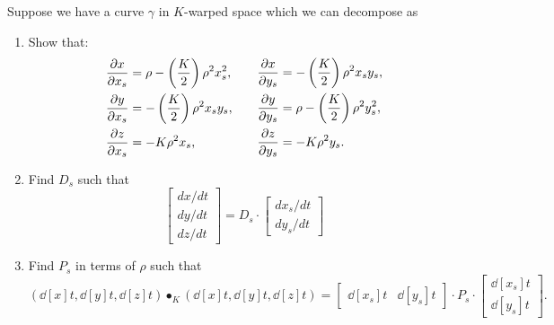 \documentclass[hints,handout,12pt,noauthor,nooutcomes]{ximera}
\begin{document}
\begin{problem}
  Suppose we have a curve $\gamma$ in $K$-warped space which we can
decompose as

\begin{center}
\end{center}

\begin{enumerate}
\item Show that:
\[
  \begin{split}
    \pp[x]{x_s} &=\rho-\left(\frac{K}{2}\right)\rho^2x_s^2,\\
    \pp[y]{x_s} &=-\left(\frac{K}{2}\right)\rho^2x_sy_s,\\
    \pp[z]{x_s} &=-K\rho^2x_s,
  \end{split}
  \qquad
  \begin{split}
    \pp[x]{y_s} &= -\left(\frac{K}{2}\right)\rho^2x_sy_s,\\
    \pp[y]{y_s} &=\rho-\left(\frac{K}{2}\right)\rho^2y_s^2,\\
    \pp[z]{y_s} &= -K\rho^2y_s.
  \end{split}
  \]
  \item Find $D_s$ such that
  \[
  \begin{bmatrix}
    dx/dt \\ dy/dt \\ dz/dt
  \end{bmatrix}
  =D_s \cdot
  \begin{bmatrix}
    dx_s/dt \\ dy_s/dt
  \end{bmatrix}
  \]
\item Find $P_s$ in terms of $\rho$ such that
  \[
  \left(\dd[x]{t}, \dd[y]{t}, \dd[z]{t}\right)\bullet_K
  \left(\dd[x]{t}, \dd[y]{t}, \dd[z]{t}\right)
  =
  \begin{bmatrix}
    \dd[x_s]{t} &  \dd[y_s]{t}
  \end{bmatrix}
  \cdot P_s
  \cdot
  \begin{bmatrix}
    \dd[x_s]{t} \\  \dd[y_s]{t}
  \end{bmatrix}.
  \]
\end{enumerate}


\end{problem}
\end{document}
